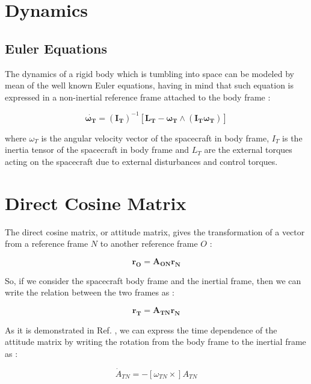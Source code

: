 \section{Dynamics}

\subsection{Euler Equations}

The dynamics of a rigid body which is tumbling into space can be modeled by mean of the well known Euler equations, having in mind that such equation is expressed in a non-inertial reference frame attached to the body frame :

\begin{equation}
  \dot{\mathbf{\omega_T}} = \mathbf{(I_T)}^{-1} \left[\mathbf{L_T} - \mathbf{\omega_T}  \wedge (\mathbf{I_T} \mathbf{\omega_T})\right]
\end{equation}

where \textbf{$\omega_T$} is the angular velocity vector of the spacecraft in body frame, \textbf{$I_T$} is the inertia tensor of the spacecraft in body frame and \textbf{$L_T$} are the external torques acting on the spacecraft due to  external disturbances and control torques.

\section{Direct Cosine Matrix}
The direct cosine matrix, or attitude matrix, gives the transformation of a vector from a reference frame $N$ to another reference frame $O$ :

\begin{equation}
  \mathbf{r_{O}} = \mathbf{A_{ON}} \mathbf{r_{N}}
\end{equation}

So, if we consider the spacecraft body frame and the inertial frame, then we can write the relation between the two frames as :

\begin{equation}
  \mathbf{r_{T}} = \mathbf{A_{TN}} \mathbf{r_{N}}
\end{equation}

As it is demonstrated in Ref. \cite{Markley2014}, we can express the time dependence of the attitude matrix by writing the rotation from the body frame to the inertial frame as :

\begin{equation}
  \dot{A}_{TN}= - [\omega_{TN} \times]A_{TN}
\end{equation}

